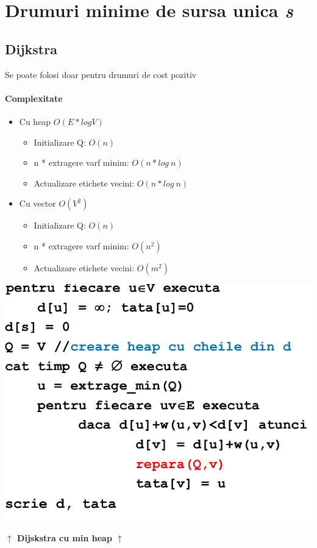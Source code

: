 \documentclass{article}
\begin{document}
\section{Drumuri minime de sursa unica \textit{s}}
\subsection*{Dijkstra}
Se poate folosi doar pentru drumuri de cost pozitiv
\paragraph*{Complexitate}
\begin{itemize}
    \item Cu heap $O(E*logV)$
          \begin{itemize}
              \item Initializare Q: $O(n)$
              \item n * extragere varf minim: $O(n*log\ n)$
              \item Actualizare etichete vecini: $O(n*log\ n)$
          \end{itemize}
    \item Cu vector $O(V^2)$
          \begin{itemize}
              \item Initializare Q: $O(n)$
              \item n * extragere varf minim: $O(n^2)$
              \item Actualizare etichete vecini: $O(m^2)$
          \end{itemize}
\end{itemize}
\begin{center}
    \includegraphics[scale=0.3]{4_dijkstra.png}
\end{center}
\begin{center}
    \textbf{$\uparrow$ Dijskstra cu min heap $\uparrow$}
\end{center}
\end{document}
